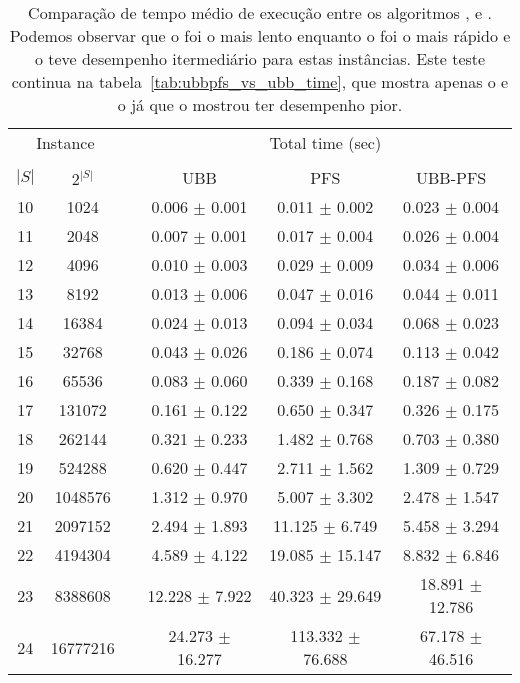 \begin{table}
\centering
\footnotesize
\begin{tabular}{cc c ccc}
\toprule
\multicolumn{2}{c}{Instance} & \phantom{} & \multicolumn{3}{c}{Total time (sec)}\\
\cline{1-2}\cline{4-6}\\
$|S|$ & $2^{|S|}$ && UBB & PFS & UBB-PFS  \\
10 &    1024 &&  0.006 $\pm$ 0.001 & 0.011 $\pm$ 0.002 & 0.023 $\pm$ 0.004 \\
11 &    2048 &&  0.007 $\pm$ 0.001 & 0.017 $\pm$ 0.004 & 0.026 $\pm$ 0.004 \\
12 &    4096 &&  0.010 $\pm$ 0.003 & 0.029 $\pm$ 0.009 & 0.034 $\pm$ 0.006 \\
13 &    8192 &&  0.013 $\pm$ 0.006 & 0.047 $\pm$ 0.016 & 0.044 $\pm$ 0.011 \\
14 &   16384 &&  0.024 $\pm$ 0.013 & 0.094 $\pm$ 0.034 & 0.068 $\pm$ 0.023 \\
15 &   32768 &&  0.043 $\pm$ 0.026 & 0.186 $\pm$ 0.074 & 0.113 $\pm$ 0.042 \\
16 &   65536 &&  0.083 $\pm$ 0.060 & 0.339 $\pm$ 0.168 & 0.187 $\pm$ 0.082 \\
17 &  131072 &&  0.161 $\pm$ 0.122 & 0.650 $\pm$ 0.347 & 0.326 $\pm$ 0.175 \\
18 &  262144 &&  0.321 $\pm$ 0.233 & 1.482 $\pm$ 0.768 & 0.703 $\pm$ 0.380 \\
19 &  524288 &&  0.620 $\pm$ 0.447 & 2.711 $\pm$ 1.562 & 1.309 $\pm$ 0.729 \\
20 & 1048576 &&  1.312 $\pm$ 0.970 & 5.007 $\pm$ 3.302 & 2.478 $\pm$ 1.547 \\
21 & 2097152 &&  2.494 $\pm$ 1.893 & 11.125 $\pm$ 6.749 & 5.458 $\pm$ 3.294 \\
22 & 4194304 &&  4.589 $\pm$ 4.122 & 19.085 $\pm$ 15.147 & 8.832 $\pm$ 6.846 \\
23 & 8388608 &&  12.228 $\pm$ 7.922 & 40.323 $\pm$ 29.649 & 18.891 $\pm$ 12.786 \\
24 & 16777216 &&  24.273 $\pm$ 16.277 & 113.332 $\pm$ 76.688 & 67.178 $\pm$ 46.516 \\
\end{tabular}
\caption{Comparação de tempo médio de execução entre os algoritmos
,  e . Podemos observar que
o  foi o mais lento enquanto o  foi o mais
rápido e o  teve desempenho itermediário para estas
instâncias. Este teste continua na tabela~\ref{tab:ubbpfs_vs_ubb_time},
que mostra apenas o  e o  já que o 
 mostrou ter desempenho pior.}
\label{tab:ubbpfs_vs_ubb_vs_pfs_time}
\end{table}

